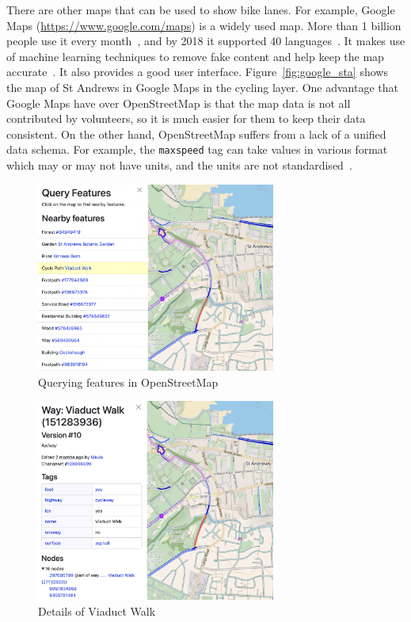 \documentclass[12pt,a4paper]{report}
\begin{document}
There are other maps that can be used to show bike lanes. For example, Google Maps (\url{https://www.google.com/maps}) is a widely used map. More than 1 billion people use it every month~\cite{ethan2019}, and by 2018 it supported 40 languages~\cite{yamagami2018}. It makes use of machine learning techniques to remove fake content and help keep the map accurate~\cite{gupta2023}. It also provides a good user interface. Figure~\ref{fig:google_sta} shows the map of St Andrews in Google Maps in the cycling layer. One advantage that Google Maps have over OpenStreetMap is that the map data is not all contributed by volunteers, so it is much easier for them to keep their data consistent. On the other hand, OpenStreetMap suffers from a lack of a unified data schema. For example, the \texttt{maxspeed} tag can take values in various format which may or may not have units, and the units are not standardised~\cite{wiki:maxspeed}.

\begin{figure}[ht!]
    \centering
    \includegraphics[width=0.7\textwidth,trim={0 8cm 5cm 0},clip]{diss_images/context/feature.png}
    \caption{Querying features in OpenStreetMap}
    \label{fig:feature_query}
\end{figure}

\begin{figure}[ht!]
    \centering
    \includegraphics[width=0.7\textwidth,trim={0 5cm 5cm 0},clip]{diss_images/context/cycleway.png}
    \caption{Details of Viaduct Walk}
    \label{fig:cycleway_query}
\end{figure}
\end{document}
